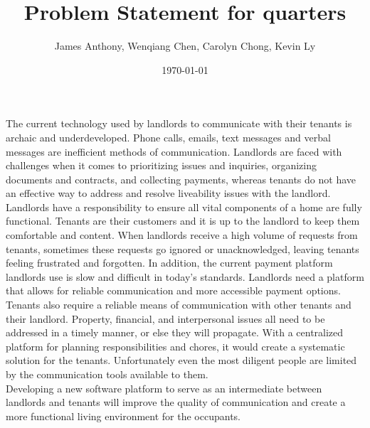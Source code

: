 \documentclass[12pt]{article}
\begin{document}
\title{Problem Statement for quarters} 
\author{James Anthony, Wenqiang Chen, Carolyn Chong, Kevin Ly}
\date{\today}
	
\maketitle

The current technology used by landlords to communicate with their tenants is 
archaic and underdeveloped. Phone calls, emails, text messages and verbal 
messages are inefficient methods of communication. Landlords are faced with 
challenges when it comes to prioritizing issues and inquiries, organizing 
documents and contracts, and collecting payments, whereas tenants do not have an 
effective way to address and resolve liveability issues with the landlord. \\

Landlords have a responsibility to ensure all vital components of a home are 
fully functional. Tenants are their customers and it is up to the landlord to 
keep them comfortable and content. When landlords receive a high volume of 
requests from tenants, sometimes these requests go ignored or unacknowledged, 
leaving tenants feeling 
frustrated and forgotten. 
In addition, the current payment platform landlords use is slow and difficult 
in today's standards. 
Landlords need a platform that allows for reliable communication and more 
accessible payment options. \\

Tenants also require a reliable means of communication with other tenants and their 
landlord. Property, financial, and interpersonal issues all need to be addressed 
in a timely manner, or else they will propagate. With a centralized 
platform for planning responsibilities and chores, it would create a systematic 
solution for the tenants. Unfortunately even the most diligent people are limited 
by the communication tools available to them. \\

Developing a new software platform to serve as an intermediate between 
landlords and tenants will improve the quality of communication 
and create a more functional living environment for the occupants.
\end{document}
